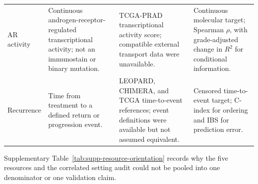 \begin{table}[H]
\begin{tabular}{@{}>{\raggedright\arraybackslash}p{}
>{\raggedright\arraybackslash}p{}
>{\raggedright\arraybackslash}p{}
>{\raggedright\arraybackslash}p{}@{}}
AR activity & Continuous androgen-receptor-regulated transcriptional activity; not an
immunostain or binary mutation. & TCGA-PRAD transcriptional activity score; compatible
external transport data were unavailable. & Continuous molecular target; Spearman $\rho$,
with grade-adjusted change in $R^2$ for conditional information. \\
Recurrence & Time from treatment to a defined return or progression event. & LEOPARD, CHIMERA,
and TCGA time-to-event references; event definitions were available but not assumed equivalent. &
Censored time-to-event target; C-index for ordering and IBS for prediction error. \\
\bottomrule
\end{tabular}
\end{table}

Supplementary Table~\ref{tab:supp-resource-orientation} records why the five resources and the correlated
setting audit could not be pooled into one denominator or one validation claim.

